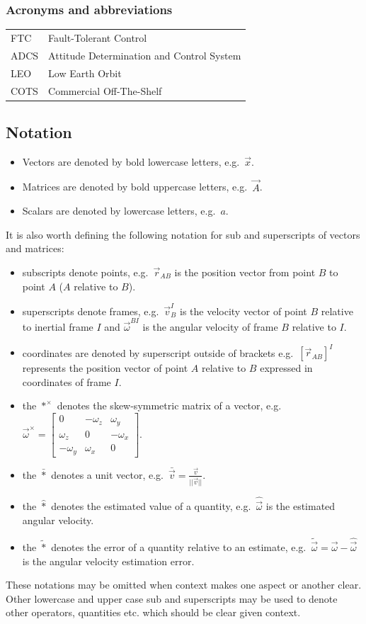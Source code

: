 \newpage
\subsubsection*{Acronyms and abbreviations}

\begingroup
\renewcommand{\arraystretch}{1.2}
\begin{tabular}{@{}p{2.5cm} l}
    FTC     & Fault-Tolerant Control \\
    ADCS    & Attitude Determination and Control System \\
    LEO    & Low Earth Orbit \\
    COTS   & Commercial Off-The-Shelf \\
\end{tabular}
\endgroup

\subsection{Notation}
\begin{itemize}
    \item Vectors are denoted by bold lowercase letters, e.g.\ $\vec{x}$.
    \item Matrices are denoted by bold uppercase letters, e.g.\ $\vec{A}$.
    \item Scalars are denoted by lowercase letters, e.g.\ $a$.
\end{itemize}
It is also worth defining the following notation for sub and superscripts of vectors and matrices:
\begin{center}
\begin{itemize}
    \item subscripts denote points, e.g.\ $\vec{r}_{AB}$ is the position vector from point $B$ to point $A$ ($A$ relative to $B$).
    \item superscripts denote frames, e.g.\ $\vec{v}^I_B$ is the velocity vector of point $B$ relative to inertial frame $I$ and $\vec{\omega}^{BI}$ is the angular velocity of frame $B$ relative to $I$.
    \item coordinates are denoted by superscript outside of brackets e.g.\ $[\vec{r}_{AB}]^I$ represents the position vector of point $A$ relative to $B$ expressed in coordinates of frame $I$.
    \item the $*^\times$ denotes the skew-symmetric matrix of a vector, e.g.\ $\vec{\omega}^\times = \begin{bmatrix} 0 & -\omega_z & \omega_y \\ \omega_z & 0 & -\omega_x \\ -\omega_y & \omega_x & 0 \end{bmatrix}$.
    \item the $\bar{*}$ denotes a unit vector, e.g.\ $\bar{\vec{v}} = \frac{\vec{v}}{||\vec{v}||}$.
    \item the $\hat{*}$ denotes the estimated value of a quantity, e.g.\ $\hat{\vec{\omega}}$ is the estimated angular velocity.
    \item the $\tilde{*}$ denotes the error of a quantity relative to an estimate, e.g.\ $\tilde{\vec{\omega}} = \vec{\omega} - \hat{\vec{\omega}}$ is the angular velocity estimation error.
\end{itemize}
\end{center}
These notations may be omitted when context makes one aspect or another clear. Other lowercase and upper case sub and superscripts may be used to denote other operators, quantities etc. which should be clear given context. 